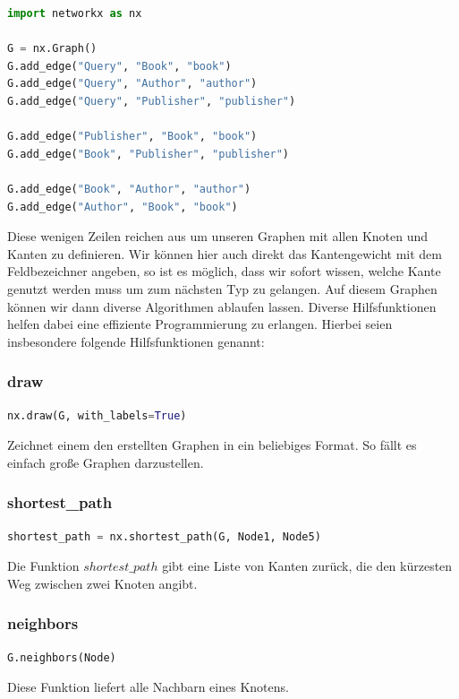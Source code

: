\begin{lstlisting}[language=Python]
import networkx as nx

G = nx.Graph()
G.add_edge("Query", "Book", "book")
G.add_edge("Query", "Author", "author")
G.add_edge("Query", "Publisher", "publisher")

G.add_edge("Publisher", "Book", "book")
G.add_edge("Book", "Publisher", "publisher")

G.add_edge("Book", "Author", "author")
G.add_edge("Author", "Book", "book")
\end{lstlisting}

Diese wenigen Zeilen reichen aus um unseren Graphen mit allen Knoten und Kanten zu definieren.
Wir können hier auch direkt das Kantengewicht mit dem Feldbezeichner angeben, so ist es möglich, dass wir sofort
wissen, welche Kante genutzt werden muss um zum nächsten Typ zu gelangen.
Auf diesem Graphen können wir dann diverse Algorithmen ablaufen lassen.
Diverse Hilfsfunktionen helfen dabei eine effiziente Programmierung zu erlangen.
Hierbei seien insbesondere folgende Hilfsfunktionen genannt:

\subsubsection{draw}
    \begin{lstlisting}[language=Python]
nx.draw(G, with_labels=True)
    \end{lstlisting}

Zeichnet einem den erstellten Graphen in ein beliebiges Format.
So fällt es einfach große Graphen darzustellen.

\subsubsection{shortest\_path}
    \begin{lstlisting}[language=Python]
shortest_path = nx.shortest_path(G, Node1, Node5)
    \end{lstlisting}

Die Funktion $shortest\_path$ gibt eine Liste von Kanten zurück, die den kürzesten Weg zwischen zwei
Knoten angibt.

\subsubsection{neighbors}
    \begin{lstlisting}[language=Python]
G.neighbors(Node)
    \end{lstlisting}
Diese Funktion liefert alle Nachbarn eines Knotens.

